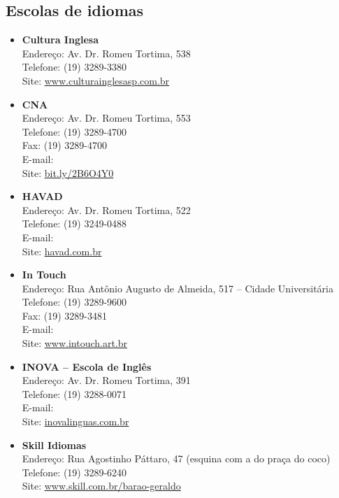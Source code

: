 \subsection{Escolas de idiomas}

\begin{itemize}
\item \textbf{Cultura Inglesa}
  \\Endereço: Av. Dr. Romeu Tortima, 538
  \\Telefone: (19) 3289-3380
  \\Site: \url{www.culturainglesasp.com.br}

\item \textbf{CNA}
  \\Endereço: Av. Dr. Romeu Tortima, 553
  \\Telefone: (19) 3289-4700
  \\Fax: (19) 3289-4700
  \\E-mail: 
  \\Site: \url{bit.ly/2B6O4Y0}

\item \textbf{HAVAD}
  \\Endereço: Av. Dr. Romeu Tortima, 522
  \\Telefone: (19) 3249-0488
  \\E-mail: 
  \\Site: \url{havad.com.br}

\item \textbf{In Touch}
  \\Endereço: Rua Antônio Augusto de Almeida, 517 -- Cidade Universitária
  \\Telefone: (19) 3289-9600
  \\Fax: (19) 3289-3481
  \\E-mail: 
  \\Site: \url{www.intouch.art.br}

\item \textbf{INOVA -- Escola de Inglês}
  \\Endereço: Av. Dr. Romeu Tortima, 391
  \\Telefone: (19) 3288-0071
  \\E-mail: 
  \\Site: \url{inovalinguas.com.br}

\item \textbf{Skill Idiomas}
  \\Endereço: Rua Agostinho Páttaro, 47 (esquina com a do praça do coco)
  \\Telefone: (19) 3289-6240
  \\Site: \url{www.skill.com.br/barao-geraldo}


\end{itemize}
